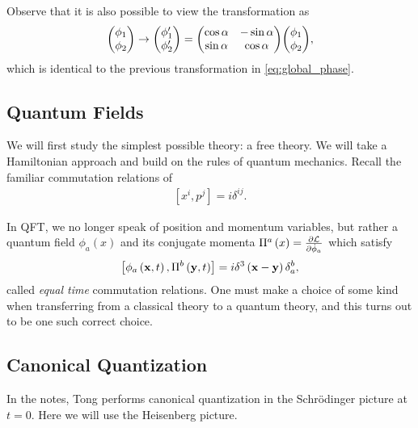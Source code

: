 \begin{example}
    Observe that it is also possible to view the transformation as
    \begin{align}
        \mqty ( \phi_1 \\ \phi_2 ) \to \mqty( \phi_1' \\ \phi_2' ) = \mqty( \cos \alpha & - \sin \alpha \\ \sin \alpha & \cos \alpha ) \mqty( \phi_1 \\ \phi_2 )
    ,\end{align}
    which is identical to the previous transformation in \cref{eq:global_phase}.

\end{example}

\subsection{Quantum Fields}

We will first study the simplest possible theory: a free theory. We will take a Hamiltonian approach and build on the rules of quantum mechanics. Recall the familiar commutation relations of
\begin{align}
    \left[ x^{i}, p^{j} \right] = i \delta^{ij}
.\end{align}

In QFT, we no longer speak of position and momentum variables, but rather a quantum field $\phi_a \left( x \right) $ and its conjugate momenta $\Pi^{a}\left( x \right) = \pdv{\mathcal{L}}{\dot{\phi}_a}$ which satisfy
\begin{align}
    \left[ \phi_a \left( \vb{x},t \right) , \Pi^{b}\left( \vb{y},t \right)  \right] = i \delta^{3} \left( \vb{x} - \vb{y} \right) \delta^{b}_a
,\end{align}
called \textit{equal time} commutation relations. One must make a choice of some kind when transferring from a classical theory to a quantum theory, and this turns out to be one such correct choice.


\subsection{Canonical Quantization}

\begin{note}
    In the notes, Tong performs canonical quantization in the Schrödinger picture at $t = 0$. Here we will use the Heisenberg picture.
\end{note}


